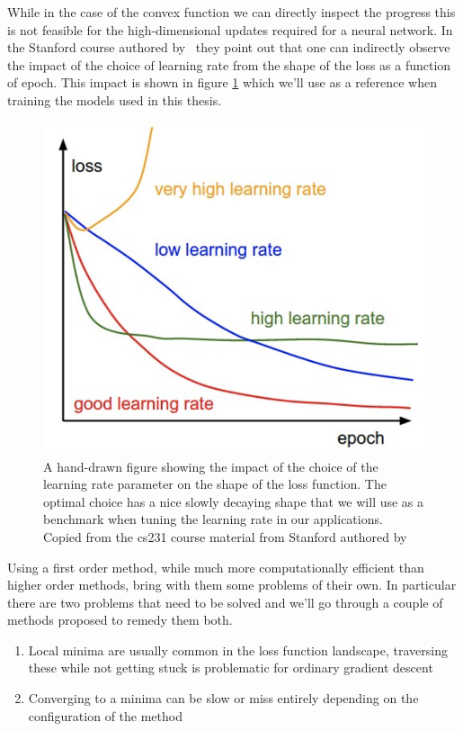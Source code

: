 \noindent While in the case of the convex function we can directly inspect the progress this is not feasible for the high-dimensional updates required for a neural network. In the Stanford course authored by \citet{Karpathy} they point out that one can indirectly observe the impact of the choice of learning rate from the shape of the loss as a function of epoch. This impact is shown in figure \ref{fig:lrloss} which we'll use as a reference when training the models used in this thesis. 

\begin{figure}[H]
\centering
\includegraphics{../figures/lr_loss.png}
\caption{A hand-drawn figure showing the impact of the choice of the learning rate parameter on the shape of the loss function. The optimal choice has a nice slowly decaying shape that we will use as a benchmark when tuning the learning rate in our applications. Copied from the cs231 course material from Stanford authored by \citet{Karpathy}}\label{fig:lrloss}

\end{figure} 

\noindent Using a first order method, while much more computationally efficient than higher order methods, bring with them some problems of their own. In particular there are two problems that need to be solved and we'll go through a couple of methods proposed to remedy them both. 


\begin{enumerate}[start=0, label={(\bfseries C\arabic*):}]
\item Local minima are usually common in the loss function landscape, traversing these while not getting stuck is problematic for ordinary gradient descent
\item Converging to a minima  can be slow or miss entirely depending on the configuration of the method 
\end{enumerate}

